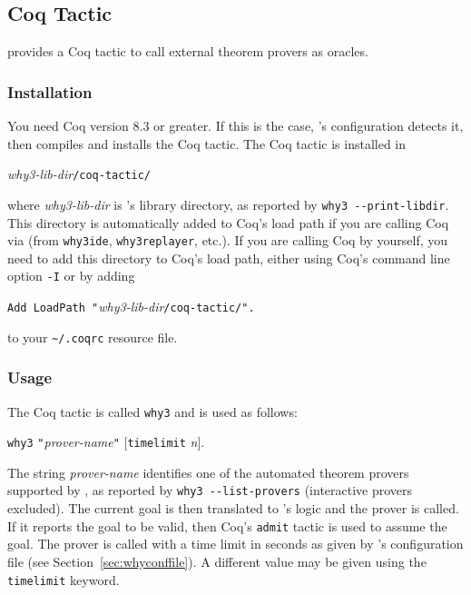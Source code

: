 \subsection{Coq Tactic}
\label{sec:coqtactic}

\why provides a Coq tactic to call external theorem provers as oracles.

\subsubsection{Installation}

You need Coq version 8.3 or greater. If this is the case, \why's
configuration detects it, then compiles and installs the Coq tactic.
The Coq tactic is installed in
\begin{center}
  \textit{why3-lib-dir}\texttt{/coq-tactic/}
\end{center}
where \textit{why3-lib-dir} is \why's library directory, as reported
by \verb+why3 --print-libdir+. This directory
is automatically added to Coq's load path if you are
calling Coq via \why (from \texttt{why3ide}, \texttt{why3replayer},
etc.). If you are calling Coq by yourself, you need to add
this directory to Coq's load path, either using Coq's command line
option \texttt{-I} or by adding
\begin{center}
  \verb+Add LoadPath "+\textit{why3-lib-dir}\verb+/coq-tactic/".+
\end{center}
to your \texttt{\~{}/.coqrc} resource file.

\subsubsection{Usage}

The Coq tactic is called \texttt{why3} and is used as follows:
\begin{center}
  \texttt{why3} \verb+"+\textit{prover-name}\verb+"+
  $[$\texttt{timelimit} \textit{n}$]$.
\end{center}
The string \textit{prover-name} identifies one of the automated theorem provers
supported by \why, as reported by \verb+why3 --list-provers+
(interactive provers excluded).
The current goal is then translated to \why's logic and the prover is
called. If it reports the goal to be valid, then Coq's \texttt{admit}
tactic is used to assume the goal. The prover is called with a time
limit in seconds as given by \why's configuration file
(see Section~\ref{sec:whyconffile}). A different value may be given
using the \texttt{timelimit} keyword.

